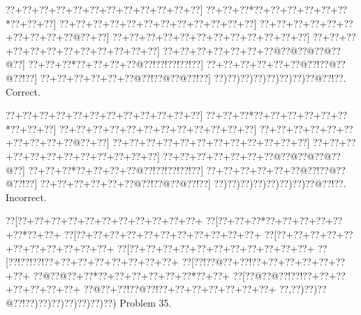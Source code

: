 \documentclass[a5paper]{article}
\begin{document}
\begin{center}
{\goo
\0??+\0??+\0??+\0??+\0??+\0??+\0??+\0??+\0??+\0??+\0??+\0??]
\0??+\0??+\0??*\0??+\0??+\0??+\0??+\0??+\0??*\0??+\0??+\0??]
\0??+\0??+\0??+\0??+\0??+\0??+\0??+\0??+\0??+\0??+\0??+\0??]
\0??+\0??+\0??+\0??+\0??+\0??+\0??+\0??+\0??+\0??@\0??+\0??]
\0??+\0??+\0??+\0??+\0??+\0??+\0??+\0??+\0??+\0??+\0??+\0??]
\0??+\0??+\0??+\0??+\0??+\0??+\0??+\0??+\0??+\0??+\0??+\0??]
\0??+\0??+\0??+\0??+\0??+\0??+\0??@\0??@\0??@\0??@\0??@\0??]
\0??+\0??+\0??*\0??+\0??+\0??+\0??@\0??!\0??!\0??!\0??!\0??]
\0??+\0??+\0??+\0??+\0??+\0??@\0??!\0??@\0??@\0??!\0??]
\0??+\0??+\0??+\0??+\0??+\0??@\0??!\0??@\0??@\0??!\0??]
\0??)\0??)\0??)\0??)\0??)\0??)\0??)\0??@\0??!\0??.
}
Correct. 

\end{center}
\begin{center}
{\goo
\0??+\0??+\0??+\0??+\0??+\0??+\0??+\0??+\0??+\0??+\0??+\0??]
\0??+\0??+\0??*\0??+\0??+\0??+\0??+\0??+\0??*\0??+\0??+\0??]
\0??+\0??+\0??+\0??+\0??+\0??+\0??+\0??+\0??+\0??+\0??+\0??]
\0??+\0??+\0??+\0??+\0??+\0??+\0??+\0??+\0??+\0??@\0??+\0??]
\0??+\0??+\0??+\0??+\0??+\0??+\0??+\0??+\0??+\0??+\0??+\0??]
\0??+\0??+\0??+\0??+\0??+\0??+\0??+\0??+\0??+\0??+\0??+\0??]
\0??+\0??+\0??+\0??+\0??+\0??+\0??@\0??@\0??@\0??@\0??@\0??]
\0??+\0??+\0??*\0??+\0??+\0??+\0??@\0??!\0??!\0??!\0??!\0??]
\0??+\0??+\0??+\0??+\0??+\0??@\0??!\0??@\0??@\0??!\0??]
\0??+\0??+\0??+\0??+\0??+\0??@\0??!\0??@\0??@\0??!\0??]
\0??)\0??)\0??)\0??)\0??)\0??)\0??)\0??@\0??!\0??.
}
Incorrect. 

\end{center}
\newpage
\begin{center}
{\goo
\0??[\0??+\0??+\0??+\0??+\0??+\0??+\0??+\0??+\0??+\0??+\0??+
\0??[\0??+\0??+\0??*\0??+\0??+\0??+\0??+\0??+\0??*\0??+\0??+
\0??[\0??+\0??+\0??+\0??+\0??+\0??+\0??+\0??+\0??+\0??+\0??+
\0??[\0??+\0??+\0??+\0??+\0??+\0??+\0??+\0??+\0??+\0??+\0??+
\0??[\0??+\0??+\0??+\0??+\0??+\0??+\0??+\0??+\0??+\0??+\0??+
\0??[\0??!\0??!\0??!\0??+\0??+\0??+\0??+\0??+\0??+\0??+\0??+
\0??[\0??!\0??@\0??+\0??!\0??+\0??+\0??+\0??+\0??+\0??+\0??+
\0??@\0??@\0??+\0??*\0??+\0??+\0??+\0??+\0??+\0??*\0??+\0??+
\0??[\0??@\0??@\0??!\0??!\0??+\0??+\0??+\0??+\0??+\0??+\0??+
\0??@\0??+\0??!\0??@\0??!\0??+\0??+\0??+\0??+\0??+\0??+\0??+
\0??,\0??)\0??)\0??@\0??!\0??)\0??)\0??)\0??)\0??)\0??)\0??)
}
Problem 35.

\end{center}
\end{document}
